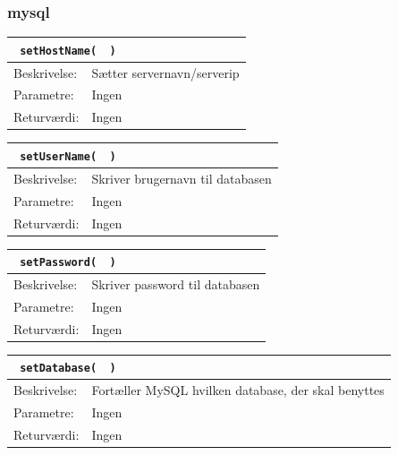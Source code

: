 \subsubsection{mysql}
\begin{table}[H]
\begin{tabular}{l p{12.5cm}}
\multicolumn{2}{l}{\texttt{\textcolor{blue}{} setHostName( \textcolor{blue}{} )}} \\
\hline
Beskrivelse: & Sætter servernavn/serverip\\
Parametre: & Ingen\\
Returværdi: & Ingen\\
\end{tabular}
\end{table}

\begin{table}[H]
\begin{tabular}{l p{12.5cm}}
\multicolumn{2}{l}{\texttt{\textcolor{blue}{} setUserName( \textcolor{blue}{} )}} \\
\hline
Beskrivelse: & Skriver brugernavn til databasen\\
Parametre: & Ingen\\
Returværdi: & Ingen\\
\end{tabular}
\end{table}

\begin{table}[H]
\begin{tabular}{l p{12.5cm}}
\multicolumn{2}{l}{\texttt{\textcolor{blue}{} setPassword( \textcolor{blue}{} )}} \\
\hline
Beskrivelse:&Skriver password til databasen\\
Parametre: & Ingen\\
Returværdi: & Ingen\\
\end{tabular}
\end{table}

\begin{table}[H]
\begin{tabular}{l p{12.5cm}}
\multicolumn{2}{l}{\texttt{\textcolor{blue}{} setDatabase( \textcolor{blue}{} )}} \\
\hline
Beskrivelse: & Fortæller MySQL hvilken database, der skal benyttes\\
Parametre: & Ingen\\
Returværdi: & Ingen\\
\end{tabular}
\end{table}

